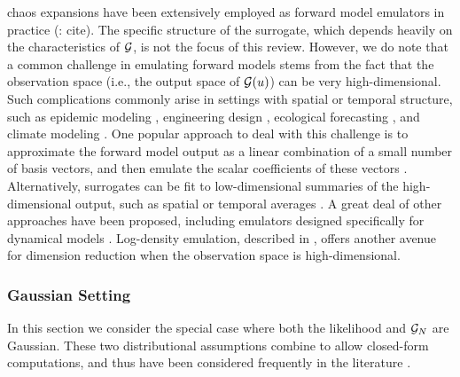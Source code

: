 \documentclass[12pt]{article}
\begin{document}
chaos expansions have been extensively employed as forward model emulators in 
practice (\todo: cite). The specific structure of the surrogate, which depends heavily on the 
characteristics of $\fwd$, is not the focus of this review. However, we do note that 
a common challenge in emulating forward models stems from the fact that the observation 
space (i.e., the output space of $\fwd(\Par)$) can be very high-dimensional. 
Such complications commonly arise in settings with spatial or temporal structure, 
such as epidemic modeling \citep{FadikarAgentBased},
engineering design \citep{PODemulation}, ecological forecasting 
\citep{emPostDens,DagonCLM}, and climate modeling \citep{ESM_modeling_2pt0,idealizedGCM}.
One popular approach to deal with this challenge is to approximate the forward model output
as a linear combination of a small number of basis vectors, and then emulate the scalar coefficients 
of these vectors \citep{HigdonBasis,FadikarAgentBased,PODemulation}. Alternatively, surrogates 
can be fit to low-dimensional summaries of the high-dimensional output, such as spatial or 
temporal averages \citep{ESM_modeling_2pt0,idealizedGCM,CLMBayesianCalibration,CLMSurrogates}.
A great deal of other approaches have been proposed, including emulators designed 
specifically for dynamical models \citep{GP_dynamic_emulation, Bayesian_emulation_dynamic, Liu_West_dynamic_emulation, dynamic_nonlinear_simulators_GP}.
Log-density emulation, described in , offers another avenue for 
dimension reduction when the observation space is high-dimensional.

\subsubsection{Gaussian Setting}
In this section we consider the special case where both the likelihood and $\fwdEm[\Ndesign]$ are Gaussian.
These two distributional assumptions combine to allow closed-form computations, and thus have 
been considered frequently in the literature \citep{StuartTeck1,GP_PDE_priors,hydrologicalModel,Surer2023sequential,VillaniAdaptiveGP,weightedIVAR,idealizedGCM,CES}.
\end{document}
